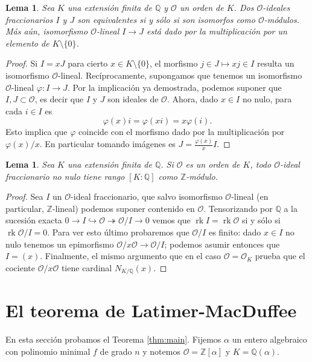 \documentclass[11pt,a4paper]{amsart}
\newcommand{\Q}{\mathbb{Q}}
\newcommand{\Z}{\mathbb{Z}}
\DeclareMathOperator{\rk}{rk}
\theoremstyle{plain}
\newtheorem{lem}[equation]{Lema}
\renewcommand{\O}{\mathcal{O}}
\begin{document}
\begin{lem} \label{lem:hom=units}
Sea $K$ una extensión finita de $\Q$ y
$\mathcal O$ un orden de $K$.
Dos $\O$-ideales fraccionarios $I$
y $J$ son equivalentes si y sólo si son isomorfos como $\O$-módulos.
Más aún, isomorfismo $\O$-lineal $I \to J$ está dado por la multiplicación
por un elemento de $K\setminus \{0\}$.
\end{lem}
\begin{proof} Si $I = xJ$ para cierto $x \in K \setminus \{0\}$,
el morfismo $j \in J \mapsto xj \in I$ resulta un isomorfismo $\O$-lineal.
Recíprocamente, supongamos que tenemos un isomorfismo $\O$-lineal
$\varphi \colon I \to J$. Por la implicación ya demostrada, podemos suponer
que $I, J \subset \O$, es decir que $I$ y $J$ son ideales de $\O$.
Ahora, dado $x \in I$ no nulo, para cada $i \in I$ es
\[
\varphi(x)i = \varphi(xi) = x\varphi(i).
\]
Esto implica que $\varphi$ coincide con el morfismo dado por la multiplicación
por $\varphi(x)/x$. En particular tomando imágenes es
$J = \frac{\varphi(x)}{x} I$.
\end{proof}

\begin{lem} \label{lem:frac-range}
Sea $K$ una extensión finita de $\Q$. Si $\O$ es
un orden de $K$, todo $\O$-ideal fraccionario no nulo
tiene rango $[K:\Q]$ como $\Z$-módulo.
\end{lem}
\begin{proof} Sea $I$ un $\O$-ideal fraccionario, que salvo
isomorfismo $\O$-lineal (en particular, $\Z$-lineal) podemos suponer
contenido en $\O$. Tensorizando por $\Q$ a la sucesión exacta
$0\to I \hookrightarrow \O \twoheadrightarrow \O/I \to 0$
vemos que $\rk I = \rk \O$ si y sólo si $\rk \O/I = 0$.
Para ver esto último probaremos que $\O/I$ es finito:
dado $x \in I$ no nulo tenemos un epimorfismo
$\O/x \O \to \O/I$; podemos asumir entonces que $I = (x)$.
Finalmente, el mismo argumento que en el caso $\O = \O_K$ prueba que
el cociente $\O/x \O$ tiene cardinal $N_{K/\Q}(x)$.
\end{proof}

\section{El teorema de Latimer-MacDuffee}

En esta sección probamos el Teorema \ref{thm:main}.
Fijemos $\alpha$ un entero algebraico con polinomio minimal $f$
de grado $n$ y notemos $\mathcal O = \Z[\alpha]$ y $K = \Q(\alpha)$.
\end{document}
